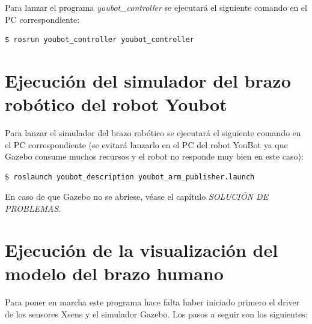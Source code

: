 \documentclass[12pt, a4paper]{report}
\begin{document}
Para lanzar el programa \textit{youbot\_controller} se ejecutará el siguiente comando en el PC correspondiente:

\begin{verbatim}
$ rosrun youbot_controller youbot_controller
\end{verbatim}

\section{Ejecución del simulador del brazo robótico del robot Youbot}

Para lanzar el simulador del brazo robótico se ejecutará el siguiente comando en el PC correspondiente (se evitará lanzarlo en el PC del robot YouBot ya que Gazebo consume muchos recursos y el robot no responde muy bien en este caso):

\begin{verbatim}
$ roslaunch youbot_description youbot_arm_publisher.launch
\end{verbatim}

En caso de que Gazebo no se abriese, véase el capítulo \textit{SOLUCIÓN DE PROBLEMAS}.

\section{Ejecución de la visualización del modelo del brazo humano}

Para poner en marcha este programa hace falta haber iniciado primero el driver de los sensores Xsens y el simulador Gazebo. Los pasos a seguir son los siguientes:
\end{document}
